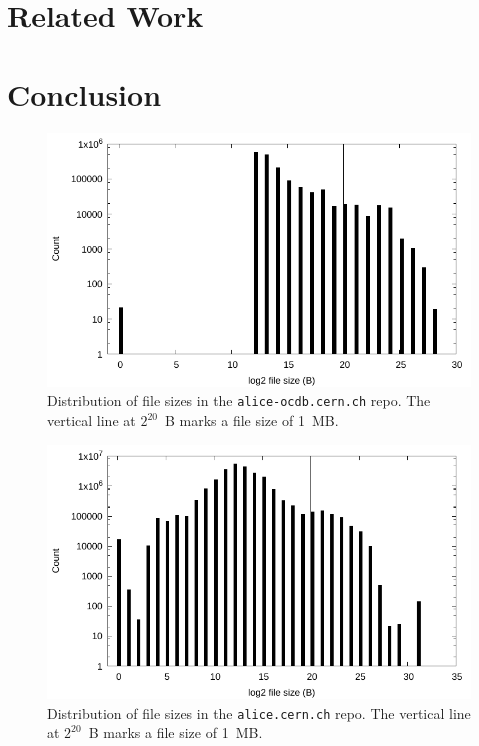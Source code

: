 \documentclass[conference]{IEEEtran}
\begin{document}
\section{Related Work}

\section{Conclusion}

\begin{figure}
\includegraphics[width=\linewidth]{plots/file-hist/alice-ocdb.pdf}
\caption{Distribution of file sizes in the \texttt{alice-ocdb.cern.ch} repo.
The vertical line at $2^{20}$~B marks a file size of 1~MB.}
\end{figure}

\begin{figure}
\includegraphics[width=\linewidth]{plots/file-hist/alice.pdf}
\caption{Distribution of file sizes in the \texttt{alice.cern.ch} repo.
The vertical line at $2^{20}$~B marks a file size of 1~MB.}
\end{figure}
\end{document}
